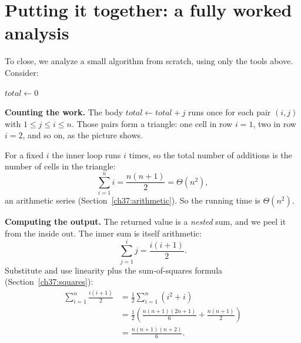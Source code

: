 \section{Putting it together: a fully worked analysis}
\label{ch37:worked}

To close, we analyze a small algorithm from scratch, using only the tools
above. Consider:

\begin{algorithm}[H]
\caption{TriangleSums}
$\textit{total} \gets 0$\;
\;
\end{algorithm}

\textbf{Counting the work.} The body $\textit{total} \gets \textit{total}+j$ runs
once for each pair $(i,j)$ with $1 \le j \le i \le n$. Those pairs form a triangle:
one cell in row $i=1$, two in row $i=2$, and so on, as the picture shows.

\begin{center}
\end{center}

For a fixed $i$ the inner loop runs $i$ times, so the total number of additions is
the number of cells in the triangle:
\[
  \sum_{i=1}^{n} i = \frac{n(n+1)}{2} = \Theta(n^2),
\]
an arithmetic series (Section~\ref{ch37:arithmetic}). So the running time is
$\Theta(n^2)$.

\textbf{Computing the output.} The returned value is a \emph{nested} sum, and we
peel it from the inside out. The inner sum is itself arithmetic:
\[
  \sum_{j=1}^{i} j = \frac{i(i+1)}{2}.
\]
Substitute and use linearity plus the sum-of-squares formula
(Section~\ref{ch37:squares}):
\begin{align*}
  \sum_{i=1}^{n}\frac{i(i+1)}{2}
   &= \frac12\sum_{i=1}^{n}(i^2 + i) \\
   &= \frac12\!\left(\frac{n(n+1)(2n+1)}{6} + \frac{n(n+1)}{2}\right) \\
   &= \frac{n(n+1)(n+2)}{6}.
\end{align*}


